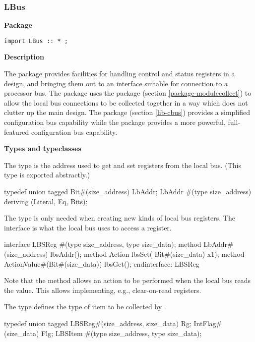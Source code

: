 \subsubsection{LBus}

{\bf Package}

\begin{verbatim}
import LBus :: * ;
\end{verbatim}


{\bf Description}

The  package provides facilities for handling control and
status registers in a design, and bringing them out to an interface
suitable for connection to a processor bus.  The  package
uses the  package (section
\ref{package-modulecollect}) to allow the local bus connections to be
collected together in a way which does not clutter up the main
design. The  package (section \ref{lib-cbus}) provides a
simplified configuration bus capability while the  package provides
a more powerful, full-featured configuration bus capability. 


{\bf Types and typeclasses}


The type  is the address used to get and set registers
from the local bus.  (This type is exported abstractly.)
\begin{libverbatim}
 typedef union tagged {
     Bit#(size_address) LbAddr;
 } LbAddr #(type size_address) deriving (Literal, Eq, Bits);
\end{libverbatim}

The  type  is only needed when creating new kinds
of local bus registers. The  interface is what the local bus uses to access
a register.
\begin{libverbatim}
 interface LBSReg #(type size_address, type size_data);
     method LbAddr#(size_address)            lbsAddr();
     method Action                 lbsSet( Bit#(size_data) x1);
     method ActionValue#(Bit#(size_data)) lbsGet();
 endinterface: LBSReg
\end{libverbatim}
Note that the  method allows an action to
be performed when the local bus reads the value.  This allows
implementing, e.g., clear-on-read registers.

The type  defines the type of item to be collected by
. 

\begin{libverbatim}
typedef union tagged {
    LBSReg#(size_address, size_data) Rg;
    IntFlag#(size_data) Flg;
} LBSItem #(type size_address, type size_data);
\end{libverbatim}

